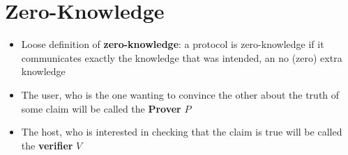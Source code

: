 \section{Zero-Knowledge}
\begin{itemize}
  \item Loose definition of \textbf{zero-knowledge}: a protocol is zero-knowledge if it communicates exactly the knowledge that was intended, an no (zero) extra knowledge
  \item The user, who is the one wanting to convince the other about the truth of some claim will be called the \textbf{Prover} $P$
  \item The host, who is interested in checking that the claim is true will be called the \textbf{verifier} $V$
\end{itemize}

